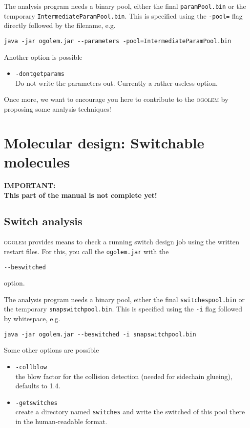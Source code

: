 \documentclass[a4paper,10pt]{scrbook}
\newcommand{\ogo}{\textsc{ogolem}}
\begin{document}
The analysis program needs a binary pool, either the final
\texttt{paramPool.bin}
or the temporary \texttt{IntermediateParamPool.bin}. This is specified using the
\texttt{-pool=} flag directly followed by the filename, e.g.
\begin{verbatim}
java -jar ogolem.jar --parameters -pool=IntermediateParamPool.bin
\end{verbatim}

Another option is possible
\begin{itemize}
  \item \texttt{-dontgetparams}\\
  Do not write the parameters out. Currently a rather useless option.
\end{itemize}

Once more, we want to encourage you here to contribute to the \ogo{} by
proposing some analysis techniques!

\chapter{Molecular design: Switchable molecules}
\textbf{IMPORTANT:\\
This part of the manual is not complete yet!}

\section{Switch analysis}
\ogo{} provides means to check a running switch design job using the written
restart files. For this, you call the
\texttt{ogolem.jar} with the
\begin{verbatim}
--beswitched
\end{verbatim}
option.

The analysis program needs a binary pool, either the final
\texttt{switchespool.bin}
or the temporary \texttt{snapswitchpool.bin}. This is specified using the
\texttt{-i} flag followed by whitespace, e.g.
\begin{verbatim}
java -jar ogolem.jar --beswitched -i snapswitchpool.bin
\end{verbatim}

Some other options are possible
\begin{itemize}
  \item \texttt{-collblow}\\
	the blow factor for the collision detection (needed for sidechain
glueing), defaults to 1.4.
  \item \texttt{-getswitches}\\
	 create a directory named \texttt{switches} and write the switched of
this pool there in the human-readable format.
\end{itemize}
\end{document}
